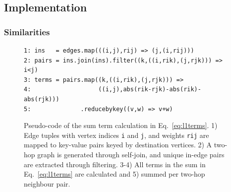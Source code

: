 \documentclass{kais}
\begin{document}
\subsection{Implementation}
\label{sec:algorithmsAndImplementation}

\subsubsection{Similarities}
\label{sec:similarity-implementation}

\begin{figure}
\begin{lstlisting}
1: ins   = edges.map(((i,j),rij) => (j,(i,rij)))
2: pairs = ins.join(ins).filter((k,((i,rik),(j,rjk))) => i<j)
3: terms = pairs.map((k,((i,rik),(j,rjk))) => 
4:                   ((i,j),abs(rik-rjk)-abs(rik)-abs(rjk)))
5:              .reducebykey((v,w) => v+w)
\end{lstlisting}
\caption{Pseudo-code of the sum term calculation in Eq.\ \ref{eq:l1terms}. 1) Edge tuples with vertex indices \texttt{i} and
 \texttt{j}, and weights \texttt{rij} are mapped to key-value pairs keyed by destination vertices. 2) A two-hop graph is 
 generated through self-join, and unique in-edge pairs are extracted through filtering. 3-4) All terms in the sum in 
 Eq.\ \ref{eq:l1terms} are calculated and 5) summed per two-hop neighbour pair.
}
\label{fig:pseudocode}
\end{figure}
\end{document}
